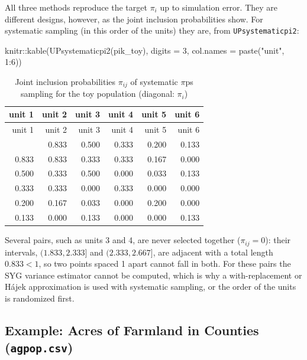\documentclass[
  letterpaper,
  DIV=11,
  numbers=noendperiod]{scrreprt}
\newenvironment{Shaded}{\begin{snugshade}}{\end{snugshade}}
\newcommand{\AttributeTok}[1]{\textcolor[rgb]{0.40,0.45,0.13}{#1}}
\newcommand{\DecValTok}[1]{\textcolor[rgb]{0.68,0.00,0.00}{#1}}
\newcommand{\FunctionTok}[1]{\textcolor[rgb]{0.28,0.35,0.67}{#1}}
\newcommand{\NormalTok}[1]{\textcolor[rgb]{0.00,0.23,0.31}{#1}}
\newcommand{\SpecialCharTok}[1]{\textcolor[rgb]{0.37,0.37,0.37}{#1}}
\newcommand{\StringTok}[1]{\textcolor[rgb]{0.13,0.47,0.30}{#1}}
\renewcommand{\[}{\begin{equation}}
\renewcommand{\]}{\end{equation}}
\begin{document}
All three methods reproduce the target \(\pi_i\) up to simulation error.
They are different designs, however, as the joint inclusion
probabilities show. For systematic sampling (in this order of the units)
they are, from \texttt{UPsystematicpi2}:

\begin{Shaded}
\begin{Highlighting}[]
\NormalTok{knitr}\SpecialCharTok{::}\FunctionTok{kable}\NormalTok{(}\FunctionTok{UPsystematicpi2}\NormalTok{(pik\_toy), }\AttributeTok{digits =} \DecValTok{3}\NormalTok{, }\AttributeTok{col.names =} \FunctionTok{paste}\NormalTok{(}\StringTok{"unit"}\NormalTok{, }\DecValTok{1}\SpecialCharTok{:}\DecValTok{6}\NormalTok{))}
\end{Highlighting}
\end{Shaded}

\begin{longtable}[]{@{}rrrrrr@{}}
\caption{Joint inclusion probabilities \(\pi_{ij}\) of systematic
\(\pi\)ps sampling for the toy population (diagonal:
\(\pi_i\))}\tabularnewline
\toprule\noalign{}
unit 1 & unit 2 & unit 3 & unit 4 & unit 5 & unit 6 \\
\midrule\noalign{}
\endfirsthead
\toprule\noalign{}
unit 1 & unit 2 & unit 3 & unit 4 & unit 5 & unit 6 \\
\midrule\noalign{}
\endhead
\bottomrule\noalign{}
\endlastfoot
1.000 & 0.833 & 0.500 & 0.333 & 0.200 & 0.133 \\
0.833 & 0.833 & 0.333 & 0.333 & 0.167 & 0.000 \\
0.500 & 0.333 & 0.500 & 0.000 & 0.033 & 0.133 \\
0.333 & 0.333 & 0.000 & 0.333 & 0.000 & 0.000 \\
0.200 & 0.167 & 0.033 & 0.000 & 0.200 & 0.000 \\
0.133 & 0.000 & 0.133 & 0.000 & 0.000 & 0.133 \\
\end{longtable}

Several pairs, such as units 3 and 4, are never selected together
(\(\pi_{ij}=0\)): their intervals, \((1.833,2.333]\) and
\((2.333,2.667]\), are adjacent with a total length \(0.833<1\), so two
points spaced 1 apart cannot fall in both. For these pairs the SYG
variance estimator cannot be computed, which is why a with-replacement
or Hájek approximation is used with systematic sampling, or the order of
the units is randomized first.

\subsection{\texorpdfstring{Example: Acres of Farmland in Counties
(\texttt{agpop.csv})}{Example: Acres of Farmland in Counties (agpop.csv)}}\label{sec-ups-wo-example}
\end{document}
